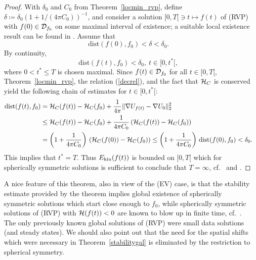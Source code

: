 \documentclass[11pt]{article}
\begin{document}
\begin{proof}
  With $\delta_0$ and $C_0$ from Theorem~\ref{locmin_rvp},
  define $\delta\coloneqq \delta_0 (1+1/(4 \pi C_0))^{-1}$,
  and consider a solution
  $[0,T[\ni t\mapsto f(t)$ of (RVP) with 
  $f(0)\in {\cal D}_{f_0}$ on some maximal interval of existence; a suitable local
  existence result can be found in \cite{KoeRe}.
  Assume that 
  \[
  \mathrm{dist}(f(0),f_{0}) < \delta < \delta_0. 
  \]
  By continuity,
  \[
  \mathrm{dist}(f(t),f_{0}) < \delta_0,\ t\in [0,t^\ast[, 
  \]
  where $0<t^\ast \leq T$ is chosen maximal.
  Since $f(t) \in {\cal D}_{f_0}$ for all $t\in [0,T[$, 
  Theorem~\ref{locmin_rvp}, the relation (\ref{decrel}),
  and the fact that ${\cal H}_C$ is conserved yield the following
  chain of estimates for 
  $t\in[0,t^\ast[$:
  \begin{align*}
    \mathrm{dist}(f(t),f_0)
    &=
    {\cal H}_C(f(t)) - {\cal H}_C(f_0) + \frac{1}{4\pi} \|\nabla U_{f(t)}-\nabla U_0\|_2^2\\
    &\leq
    {\cal H}_C(f(t)) - {\cal H}_C(f_0) +
    \frac{1}{4 \pi C_0} \left({\cal H}_C(f(t)) - {\cal H}_C(f_0)\right)\\
    &=
    \left(1+\frac{1}{4 \pi C_0}\right) \, \left({\cal H}_C(f(0)) - {\cal H}_C(f_0)\right)
    \leq
    \left(1+\frac{1}{4 \pi C_0}\right)\,\mathrm{dist}(f(0),f_0) < \delta_0.
  \end{align*}
  This implies that $t^\ast = T$. Thus $E_\mathrm{kin}(f(t))$ is bounded on $[0,T[$
  which for spherically symmetric solutions 
  is sufficient to conclude that $T=\infty$, cf.~\cite[Prop.~4.1]{HaRe2007}
  and \cite{KoeRe}.
\end{proof}
%
%
A nice feature of this theorem,
also in view of the (EV) case, is that the stability estimate
provided by the theorem implies global existence of spherically
symmetric solutions which start close enough to $f_0$, while spherically
symmetric solutions of (RVP) with ${\cal H} (f(t))<0$ are known to blow up
in finite time, cf.~\cite{GlSch}.
The only previously known global solutions
of (RVP) were small data solutions (and steady states).
We should also point out that the need for the spatial shifts
which were necessary in Theorem~\ref{stabilitygal} is eliminated by the
restriction to spherical symmetry.
\end{document}
